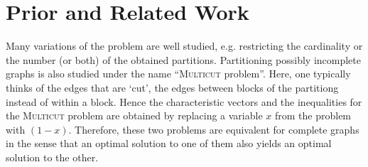 \section{Prior and Related Work}\label{sec:related}



Many variations of the problem are well studied, e.g. restricting the cardinality or the number (or both) of the obtained partitions.
Partitioning possibly incomplete graphs is also studied under the name “\textsc{Multicut} problem”.
Here, one typically thinks of the edges that are ‘cut’, \ie the edges between blocks of the partitiong instead of within a block.
Hence the characteristic vectors and the inequalities for the \textsc{Multicut} problem are obtained by replacing a variable $x$ from the \CP problem with $(1-x)$.
Therefore, these two problems are equivalent for complete graphs in the sense that an optimal solution to one of them also yields an optimal solution to the other.
